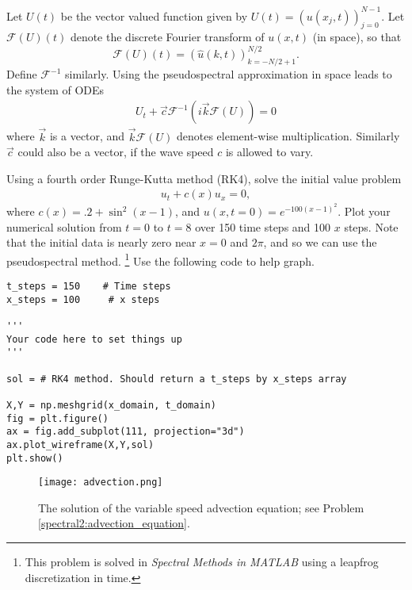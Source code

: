 Let $U(t)$ be the vector valued function given by $U(t) = (u(x_j,t))_{j=0}^{N-1}$.
Let $\mathcal{F}(U)(t)$ denote the discrete Fourier transform of $u(x,t)$ (in space), so that 
\[
\mathcal{F}(U)(t) = (\hat{u}(k,t))_{k=-N/2+1}^{N/2}.
\]
Define $\mathcal{F}^{-1}$ similarly.
Using the pseudospectral approximation in space leads to the system of ODEs
\begin{align}
	U_t +  \vec{c}\mathcal{F}^{-1}\left(i\vec{k}\mathcal{F}(U) \right) = 0
\end{align}
where $\vec{k}$ is a vector, and $\vec{k}\mathcal{F}(U) $ denotes element-wise multiplication. 
Similarly $\vec{c}$ could also be a vector, if the wave speed $c$ is allowed to vary. 


\begin{problem}
	Using a fourth order Runge-Kutta method (RK4), solve the initial value problem 
	\begin{align}
		u_t +c(x) u_x = 0,
	\end{align}
	where $c(x) = .2 + \sin^2(x-1)$, and $u(x,t=0) = e^{-100(x-1)^2}.$  Plot your numerical solution from $t = 0$ to $t = 8$ over 150 time steps and 100 $x$ steps.  Note that the initial data is nearly zero near $x = 0$ and  $2 \pi$, and so we can use the pseudospectral method. \footnote{This problem is solved in \textit{Spectral Methods in MATLAB} using a leapfrog discretization in time. } 
	\label{spectral2:advection_equation}
	Use the following code to help graph.
\begin{lstlisting}
t_steps = 150    # Time steps
x_steps = 100     # x steps

'''
Your code here to set things up
'''

sol = # RK4 method. Should return a t_steps by x_steps array

X,Y = np.meshgrid(x_domain, t_domain)
fig = plt.figure()
ax = fig.add_subplot(111, projection="3d")
ax.plot_wireframe(X,Y,sol)
plt.show()

\end{lstlisting}


\end{problem}



\begin{figure}
\centering
\texttt{[image: advection.png]}
\caption{The solution of the variable speed advection equation; see Problem  \ref{spectral2:advection_equation}.}
\label{fig:spectral:spectral2_advection}
\end{figure}